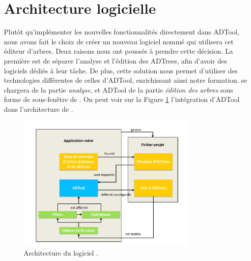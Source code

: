 \section{Architecture logicielle}

	Plutôt qu'implémenter les nouvelles fonctionnalités directement dans ADTool, nous avons fait le choix de créer un nouveau logiciel nommé \glasir{} qui utilisera cet éditeur d'arbres. Deux raisons nous ont poussés à prendre cette décision. La première est de séparer l'analyse et l'édition des ADTrees, afin d'avoir des logiciels dédiés à leur tâche. De plus, cette solution nous permet d'utiliser des technologies différentes de celles d'ADTool, enrichissant ainsi notre formation. \glasir{} se chargera de la partie \textit{analyse}, et ADTool de la partie \textit{édition des arbres} sous forme de sous-fenêtre de \glasir{}. On peut voir sur la {\sc Figure} \ref{fig:architecture_Glasir} l'intégration d'ADTool dans l'architecture de \glasir. 

	\begin{figure}[h!]
		\centering
			\includegraphics[width=0.8\textwidth]{figure/archiGlasir.pdf}
		\caption{Architecture du logiciel \glasir.}
		\label{fig:architecture_Glasir}
	\end{figure}